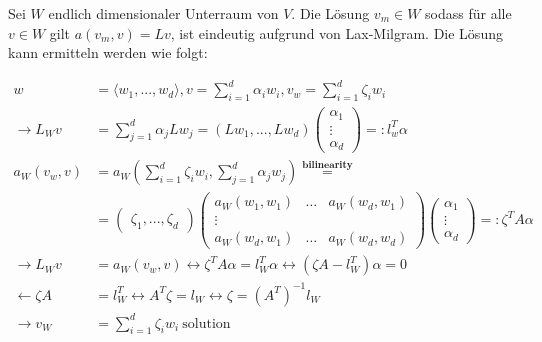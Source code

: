 \begin{satz}
 Sei $W$ endlich dimensionaler Unterraum von $V$. Die Lösung $v_m \in W $ sodass für alle $v \in W$ gilt $a(v_m,v) = Lv$, ist eindeutig aufgrund von Lax-Milgram.
 Die Lösung kann ermitteln werden wie folgt:
 
 \begin{align*}
 	w &= \langle w_1,...,w_d \rangle, v = \sum_{i=1}^{d} \alpha_i w_i, v_w = \sum_{i=1}^{d} \zeta_i w_i \\
 	\rightarrow L_W v &= \sum_{j=1}^{d} \alpha_j L w_j = (Lw_1,...,Lw_d) \left(\begin{smallmatrix}
 		\alpha_1 \\
 		\vdots \\
 		\alpha_d
 	\end{smallmatrix}\right) =: l_w^T \alpha \\
 	a_W(v_w,v) &= a_W(\sum_{i=1}^{d} \zeta_i w_i, \sum_{j=1}^{d} \alpha_j w_j) \overset{\textbf{bilinearity}}{=} \\ &= \left(\begin{smallmatrix}
 		\zeta_1,...,\zeta_d
 	\end{smallmatrix}\right)  \left(\begin{smallmatrix}
	 		a_W(w_1,w_1) & \hdots & a_W(w_d,w_1) \\
	 		\vdots & & \\
	 		a_W(w_d,w_1) & \hdots & a_W(w_d,w_d) 
	\end{smallmatrix}\right)
	\left(\begin{smallmatrix}
		\alpha_1 \\
		\vdots \\
		\alpha_d
	\end{smallmatrix}\right) =: \zeta^T A \alpha \\
	\rightarrow L_Wv &= a_W(v_w,v) \leftrightarrow \zeta^T A \alpha = l_W^T \alpha \leftrightarrow (\zeta A - l_W^T) \alpha = 0 \\ \leftarrow \zeta A &= l_W^T \leftrightarrow A^T \zeta = l_W \leftrightarrow \zeta = (A^T)^{-1} l_W \\
	\rightarrow v_W &= \sum_{i=1}^{d} \zeta_i w_i \medspace \text{solution}
 \end{align*}
\end{satz}

